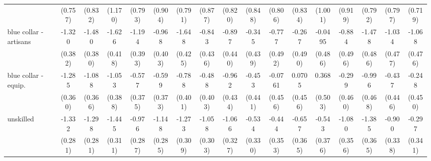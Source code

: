 {\begin{tabular}{l*{16}{c}}
                    &     (0.757)         &     (0.832)         &     (1.170)         &     (0.793)         &     (0.904)         &     (0.791)         &     (0.877)         &     (0.820)         &     (0.848)         &     (0.806)         &     (0.834)         &     (1.001)         &     (0.919)         &     (0.792)         &     (0.797)         &     (0.719)         \\
[1em]
blue collar - artisans&      -1.320\sym{***}&      -1.480\sym{***}&      -1.626\sym{***}&      -1.194\sym{**} &      -0.968\sym{*}  &      -1.648\sym{***}&      -0.843         &      -0.897\sym{*}  &      -0.345         &      -0.777         &      -0.267         &     -0.0495         &      -0.884         &      -1.478\sym{**} &      -1.034\sym{*}  &      -1.068\sym{*}  \\
                    &     (0.382)         &     (0.380)         &     (0.418)         &     (0.393)         &     (0.403)         &     (0.425)         &     (0.436)         &     (0.440)         &     (0.439)         &     (0.492)         &     (0.490)         &     (0.486)         &     (0.496)         &     (0.486)         &     (0.477)         &     (0.476)         \\
[1em]
blue collar - equip.&      -1.285\sym{***}&      -1.088\sym{**} &      -1.053\sym{**} &      -0.577         &      -0.599         &      -0.788\sym{*}  &      -0.488         &      -0.962\sym{*}  &      -0.453         &     -0.0761         &      0.0705         &       0.368         &      -0.299         &      -0.996\sym{*}  &      -0.437         &      -0.248         \\
                    &     (0.360)         &     (0.366)         &     (0.388)         &     (0.375)         &     (0.373)         &     (0.401)         &     (0.403)         &     (0.434)         &     (0.441)         &     (0.456)         &     (0.456)         &     (0.503)         &     (0.460)         &     (0.468)         &     (0.446)         &     (0.450)         \\
[1em]
unskilled           &      -1.332\sym{***}&      -1.298\sym{***}&      -1.445\sym{***}&      -0.976\sym{***}&      -1.148\sym{***}&      -1.273\sym{***}&      -1.058\sym{***}&      -1.066\sym{**} &      -0.534         &      -0.444         &      -0.657         &      -0.543         &      -1.080\sym{**} &      -1.385\sym{***}&      -0.900\sym{**} &      -0.297         \\
                    &     (0.281)         &     (0.281)         &     (0.311)         &     (0.287)         &     (0.285)         &     (0.309)         &     (0.303)         &     (0.327)         &     (0.330)         &     (0.353)         &     (0.365)         &     (0.376)         &     (0.356)         &     (0.365)         &     (0.338)         &     (0.341)         \\

\end{tabular}}
